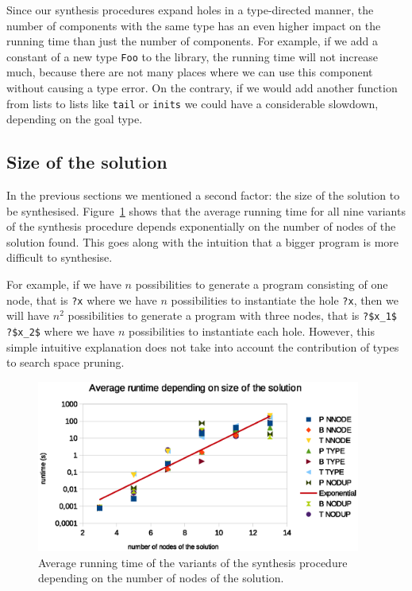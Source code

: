 Since our synthesis procedures expand holes in a type-directed manner, the number of components with the same type has an even higher impact on the running time than just the number of components. For example, if we add a constant of a new type \lstinline?Foo? to the library, the running time will not increase much, because there are not many places where we can use this component without causing a type error. On the contrary, if we would add another function from lists to lists like \lstinline?tail? or \lstinline?inits? we could have a considerable slowdown, depending on the goal type. 

\subsection{Size of the solution}
In the previous sections we mentioned a second factor: the size of the solution to be synthesised. Figure~\ref{fig:runtime_vs_nof_nodes} shows that the average running time for all nine variants of the synthesis procedure depends exponentially on the number of nodes of the solution found. This goes along with the intuition that a bigger program is more difficult to synthesise.

For example, if we have $n$ possibilities to generate a program consisting of one node, that is \lstinline!?x! where we have $n$ possibilities to instantiate the hole \lstinline!?x!, then we will have $n^2$ possibilities to generate a program with three nodes, that is \lstinline!?$x_1$ ?$x_2$! where we have $n$ possibilities to instantiate each hole. However, this simple intuitive explanation does not take into account the contribution of types to search space pruning.

\begin{figure}
    \centering
    \includegraphics[width=0.95\textwidth]{time_vs_nof_nodes.eps}
    \caption{Average running time of the variants of the synthesis procedure depending on the number of nodes of the solution.}
    \label{fig:runtime_vs_nof_nodes}
\end{figure}

